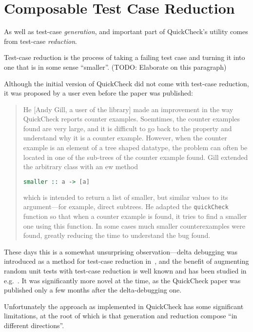 \chapter{Composable Test Case Reduction}

As well as test-case \emph{generation},
and important part of QuickCheck's utility comes from test-case \emph{reduction}.

Test-case reduction is the process of taking a failing test case and turning it into one that is in some sense ``smaller''.
(TODO: Elaborate on this paragraph)

Although the initial version of QuickCheck did not come with test-case reduction,
it was proposed by a user even before the paper was published:

\begin{quote}
He [Andy Gill, a user of the library] made an improvement in the way QuickCheck reports counter examples.
Soemtimes, the counter examples found are very large,
and it is difficult to go back to the property and understand why it is a counter example.
However,
when the counter example is an element of a tree shaped datatype,
the problem can often be located in one of the sub-trees of the counter example found.
Gill extended the arbitrary class with an ew method

\begin{lstlisting}[language=Haskell]
smaller :: a -> [a]
\end{lstlisting}

which is intended to return a list of smaller, but similar values to its argument---for example, direct subtrees.
He adapted the \texttt{quickCheck} function so that when a counter example is found,
it tries to find a smaller one using this function.
In some cases much smaller counterexamples were found,
greatly reducing the time to understand the bug found.
\end{quote}

These days this is a somewhat unsurprising observation---delta
debugging was introduced as a method for test-case reduction in~\cite{DBLP:journals/tse/ZellerH02},
and the benefit of augmenting random unit tests with test-case reduction is well known and has been studied in e.g.~\cite{DBLP:conf/issre/LeiA05, DBLP:conf/pldi/RegehrCCEEY12}.
It was significantly more novel at the time,
as the QuickCheck paper was published only a few months after the delta-debugging one.

Unfortunately the approach as implemented in QuickCheck has some significant limitations,
at the root of which is that generation and reduction compose ``in different directions''.


